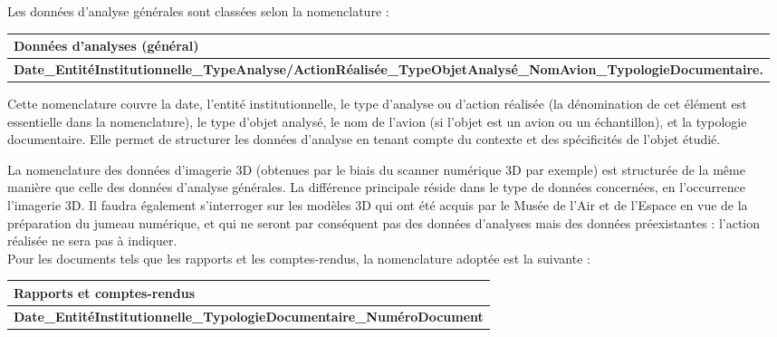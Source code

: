 Les données d'analyse générales sont classées selon la nomenclature :\\ 

\begin{center}
\begin{adjustbox}{width=0.85\textwidth} 
\begin{tabularx}{\textwidth}{|X|}
\hline
\textbf{Données d'analyses (général)} \\ \hline
\textbf{Date\_EntitéInstitutionnelle\_TypeAnalyse/ActionRéalisée\linebreak \_TypeObjetAnalysé\_NomAvion\_TypologieDocumentaire.} \\ \hline
\end{tabularx}
\end{adjustbox}
\end{center}

Cette nomenclature couvre la date, l'entité institutionnelle, le type d'analyse ou d'action réalisée (la dénomination de cet élément est essentielle dans la nomenclature), le type d'objet analysé, le nom de l'avion (si l'objet est un avion ou un échantillon), et la typologie documentaire. Elle permet de structurer les données d'analyse en tenant compte du contexte et des spécificités de l'objet étudié.

La nomenclature des données d’imagerie 3D (obtenues par le biais du scanner numérique 3D par exemple) est structurée de la même manière que celle des données d'analyse générales. La différence principale réside dans le type de données concernées, en l'occurrence l'imagerie 3D. Il faudra également s’interroger sur les modèles 3D qui ont été acquis par le Musée de l’Air et de l’Espace en vue de la préparation du jumeau numérique, et qui ne seront par conséquent pas des données d’analyses mais des données préexistantes : l’action réalisée ne sera pas à indiquer.\\

Pour les documents tels que les rapports et les comptes-rendus, la nomenclature adoptée est la suivante :\\ 

\begin{center}
\begin{adjustbox}{width=0.85\textwidth} 
\begin{tabularx}{\textwidth}{|X|}
\hline
\textbf{Rapports et comptes-rendus} \\ \hline
\textbf{Date\_EntitéInstitutionnelle\_TypologieDocumentaire\_NuméroDocument} \\ \hline
\end{tabularx}
\end{adjustbox}
\end{center}

